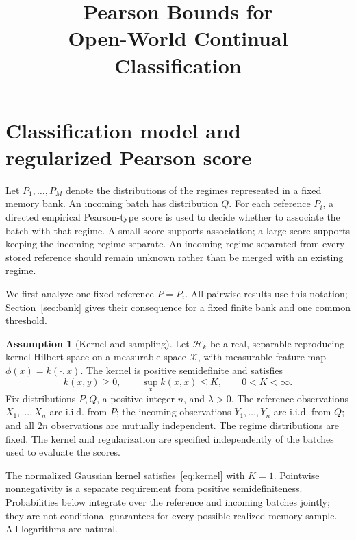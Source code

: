 \documentclass[11pt,a4paper]{article}
\title{Pearson Bounds for\\Open-World Continual Classification}
\author{}
\date{}
\theoremstyle{definition}
\newtheorem{assumption}[theorem]{Assumption}
\theoremstyle{remark}
\newcommand{\HH}{\mathcal H_k}
\begin{document}
\maketitle

\section{Classification model and regularized Pearson score}\label{sec:setup}
Let $P_1,\ldots,P_M$ denote the distributions of the regimes represented
in a fixed memory bank. An incoming batch has distribution $Q$.
For each reference $P_i$, a directed empirical Pearson-type score
is used to decide whether to associate the batch with that regime.
A small score supports association; a large score supports keeping
the incoming regime separate. An incoming regime separated from every
stored reference should remain unknown rather than be merged with an
existing regime.

We first analyze one fixed reference $P=P_i$. All pairwise results use
this notation; Section~\ref{sec:bank} gives their consequence for a fixed
finite bank and one common threshold.

\begin{assumption}[Kernel and sampling]\label{ass:setup}
Let $\HH$ be a real, separable reproducing kernel Hilbert space on a
measurable space $\mathcal X$, with measurable feature map
$\phi(x)=k(\cdot,x)$. The kernel is positive semidefinite and satisfies
\begin{equation}\label{eq:kernel}
 k(x,y)\ge0,\qquad \sup_x k(x,x)\le K,\qquad 0<K<\infty.
\end{equation}
Fix distributions $P,Q$, a positive integer $n$, and $\lambda>0$.
The reference observations $X_1,\ldots,X_n$ are i.i.d. from $P$;
the incoming observations $Y_1,\ldots,Y_n$ are i.i.d. from $Q$;
and all $2n$ observations are mutually independent. The regime
distributions are fixed. The kernel and regularization are specified
independently of the batches used to evaluate the scores.
\end{assumption}

The normalized Gaussian kernel satisfies~\eqref{eq:kernel} with $K=1$.
Pointwise nonnegativity is a separate requirement from positive
semidefiniteness. Probabilities below integrate over the reference and
incoming batches jointly; they are not conditional guarantees for every
possible realized memory sample. All logarithms are natural.
\end{document}
